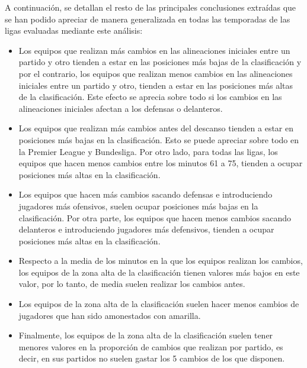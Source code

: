 A continuación, se detallan el resto de las principales conclusiones extraídas que se han podido 
apreciar de manera generalizada en todas las temporadas de las ligas evaluadas mediante este 
análisis:


\begin{itemize}
    \item Los equipos que realizan más cambios en las alineaciones iniciales entre un partido y otro
    tienden a estar en las posiciones más bajas de la clasificación y por el contrario, los 
    equipos que realizan menos cambios en las alineaciones iniciales entre un partido y otro, 
    tienden a estar en las posiciones más altas de la clasificación. Este efecto se aprecia sobre 
    todo si los cambios en las alineaciones iniciales afectan a los defensas o delanteros.
    \item Los equipos que realizan más cambios antes del descanso tienden a estar en posiciones 
    más bajas en la clasificación. Esto se puede apreciar sobre todo en la Premier League y 
    Bundesliga. Por otro lado, para todas las ligas, los equipos que hacen menos cambios 
    entre los minutos 61 a 75, tienden a ocupar posiciones más altas en la clasificación.
    \item Los equipos que hacen más cambios sacando defensas e introduciendo jugadores más
    ofensivos, suelen ocupar posiciones más bajas en la clasificación. Por otra parte, los 
    equipos que hacen menos cambios sacando delanteros e introduciendo jugadores más
    defensivos, tienden a ocupar posiciones más altas en la clasificación.
    \item Respecto a la media de los minutos en la que los equipos realizan los cambios, los equipos 
    de la zona alta de la clasificación tienen valores más bajos en este valor, por lo tanto, de 
    media suelen realizar los cambios antes.
    \item Los equipos de la zona alta de la clasificación suelen hacer menos cambios de jugadores 
    que han sido amonestados con amarilla.
    \item Finalmente, los equipos de la zona alta de la clasificación suelen tener menores valores en la 
    proporción de cambios que realizan por partido, es decir, en sus partidos no suelen gastar
    los 5 cambios de los que disponen.
    
\end{itemize}

